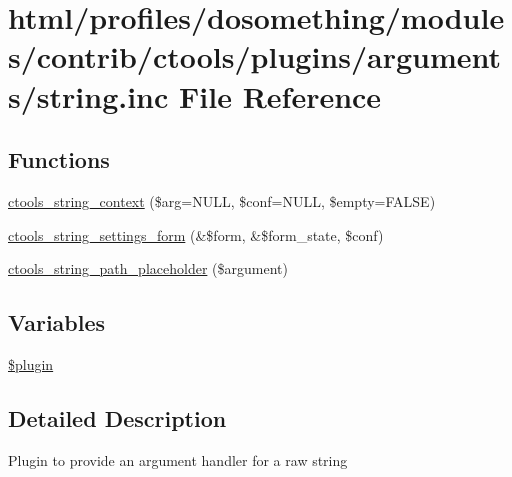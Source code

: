 \hypertarget{arguments_2string_8inc}{
\section{html/profiles/dosomething/modules/contrib/ctools/plugins/arguments/string.inc File Reference}
\label{arguments_2string_8inc}
}
\subsection*{Functions}
\begin{DoxyCompactItemize}
\item 
\hyperlink{arguments_2string_8inc_ad47d630ad294ffd29f4dc502b07416ae}{ctools\_\-string\_\-context} (\$arg=NULL, \$conf=NULL, \$empty=FALSE)
\item 
\hyperlink{arguments_2string_8inc_ab40b10ac883ae70f03cf674629d6737b}{ctools\_\-string\_\-settings\_\-form} (\&\$form, \&\$form\_\-state, \$conf)
\item 
\hyperlink{arguments_2string_8inc_ae35deb3ebcdeeb584ef025aac2ff6cf3}{ctools\_\-string\_\-path\_\-placeholder} (\$argument)
\end{DoxyCompactItemize}
\subsection*{Variables}
\begin{DoxyCompactItemize}
\item 
\hyperlink{arguments_2string_8inc_ada8a7130088351710bb02ed622d6bf65}{\$plugin}
\end{DoxyCompactItemize}


\subsection{Detailed Description}
Plugin to provide an argument handler for a raw string 

